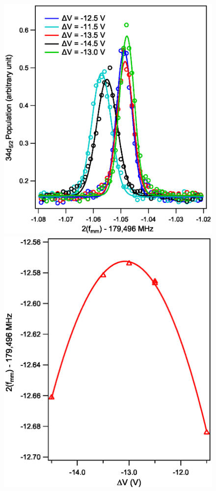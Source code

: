 \documentclass[landscape]{sciposter}
\begin{document}
\begin{multicols}{4}
\begin{figure}
\begin{center}
\includegraphics[scale = 0.65]{33d52_deltaV_population.eps}
\includegraphics[scale = 0.65]{33d52_DeltaV.eps}

\end{center}
\end{figure}
\end{multicols}
\end{document}
